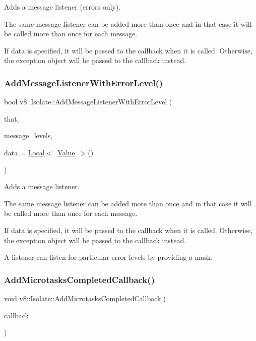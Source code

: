 Adds a message listener (errors only).

The same message listener can be added more than once and in that case it will be called more than once for each message.

If data is specified, it will be passed to the callback when it is called. Otherwise, the exception object will be passed to the callback instead. \mbox{\label{classv8_1_1Isolate_a6f617fa658aafcb299f386e637fd2e11}} 
\subsubsection{\texorpdfstring{Add\+Message\+Listener\+With\+Error\+Level()}{AddMessageListenerWithErrorLevel()}}
{\footnotesize\ttfamily bool v8\+::\+Isolate\+::\+Add\+Message\+Listener\+With\+Error\+Level (\begin{DoxyParamCaption}\item[{Message\+Callback}]{that,  }\item[{int}]{message\+\_\+levels,  }\item[{\mbox{\hyperlink{classv8_1_1Local}{Local}}$<$ \mbox{\hyperlink{classv8_1_1Value}{Value}} $>$}]{data = {\ttfamily \mbox{\hyperlink{classv8_1_1Local}{Local}}$<$~\mbox{\hyperlink{classv8_1_1Value}{Value}}~$>$()} }\end{DoxyParamCaption})}

Adds a message listener.

The same message listener can be added more than once and in that case it will be called more than once for each message.

If data is specified, it will be passed to the callback when it is called. Otherwise, the exception object will be passed to the callback instead.

A listener can listen for particular error levels by providing a mask. \mbox{\label{classv8_1_1Isolate_ae9c09d4763df6c3f06c686eebcce2834}} 
\subsubsection{\texorpdfstring{Add\+Microtasks\+Completed\+Callback()}{AddMicrotasksCompletedCallback()}}
{\footnotesize\ttfamily void v8\+::\+Isolate\+::\+Add\+Microtasks\+Completed\+Callback (\begin{DoxyParamCaption}\item[{Microtasks\+Completed\+Callback}]{callback }\end{DoxyParamCaption})}

